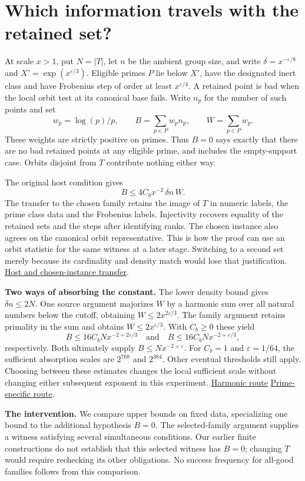 \documentclass[12pt,letterpaper]{article}
\newcommand{\orig}[3]{\href{https://github.com/nousentllc/riemann-hypothesis/blob/40e56bab026552e089d7afcfeff08d2defb9c005/src/#1.lean\#L#2}{#3}}
\newcommand{\para}[1]{\par\medskip\noindent\textbf{#1}\quad}
\newcommand{\pagepart}[1]{\clearpage\section{#1}}
\begin{document}
\pagepart{Which information travels with the retained set?}
At scale \(x>1\), put \(N=|T|\), let \(n\) be the ambient group size, and write \(\delta=x^{-\varepsilon/8}\) and \(X'=\exp(x^{\varepsilon/3})\). Eligible primes \(P\) lie below \(X'\), have the designated inert class and have Frobenius step of order at least \(x^{\varepsilon/4}\). A retained point is bad when the local orbit test at its canonical base fails. Write \(n_p\) for the number of such points and set
\[
 w_p=\log(p)/p,\qquad B=\sum_{p\in P}w_p n_p,\qquad W=\sum_{p\in P}w_p.
\]
These weights are strictly positive on primes. Thus \(B=0\) says exactly that there are no bad retained points at any eligible prime, and includes the empty-support case. Orbits disjoint from \(T\) contribute nothing either way.

The original host condition gives
\[
 B\le 4 C_b x^{-2}\,\delta n\,W .
\]
The transfer to the chosen family retains the image of \(T\) in numeric labels, the prime class data and the Frobenius labels. Injectivity recovers equality of the retained sets and the steps after identifying ranks. The chosen instance also agrees on the canonical orbit representative. This is how the proof can use an orbit statistic for the same witness at a later stage. Switching to a second set merely because its cardinality and density match would lose that justification.
\orig{Development/AbelianVarietyTheory/Proofs/GlobalInterpolation/BadCharacterBound}{24}{Host and chosen-instance transfer}.

\para{Two ways of absorbing the constant.} The lower density bound gives \(\delta n\le 2N\). One source argument majorizes \(W\) by a harmonic sum over all natural numbers below the cutoff, obtaining \(W\le2x^{2\varepsilon/3}\). The family argument retains primality in the sum and obtains \(W\le2x^{\varepsilon/3}\). With \(C_b\ge0\) these yield
\[
 B\le 16 C_b N x^{-2+2\varepsilon/3}
 \quad\text{and}\quad
 B\le 16 C_b N x^{-2+\varepsilon/3},
\]
respectively. Both ultimately supply \(B\le Nx^{-2+\varepsilon}\). For \(C_b=1\) and \(\varepsilon=1/64\), the sufficient absorption scales are \(2^{768}\) and \(2^{384}\). Other eventual thresholds still apply. Choosing between these estimates changes the local sufficient scale without changing either subsequent exponent in this experiment.
\orig{Development/AbelianVarietyTheory/Proofs/GlobalInterpolation/ObjOnNarrowOfObjectsExist}{98}{Harmonic route}\quad
\orig{Formalism/SharpRestriction/GlobalSchurBounds/LossesSmallShares}{357}{Prime-specific route}.

\para{The intervention.} We compare upper bounds on fixed data, specializing one bound to the additional hypothesis \(B=0\). The selected-family argument supplies a witness satisfying several simultaneous conditions. Our earlier finite constructions do not establish that this selected witness has \(B=0\); changing \(T\) would require rechecking its other obligations. No success frequency for all-good families follows from this comparison.
\end{document}
